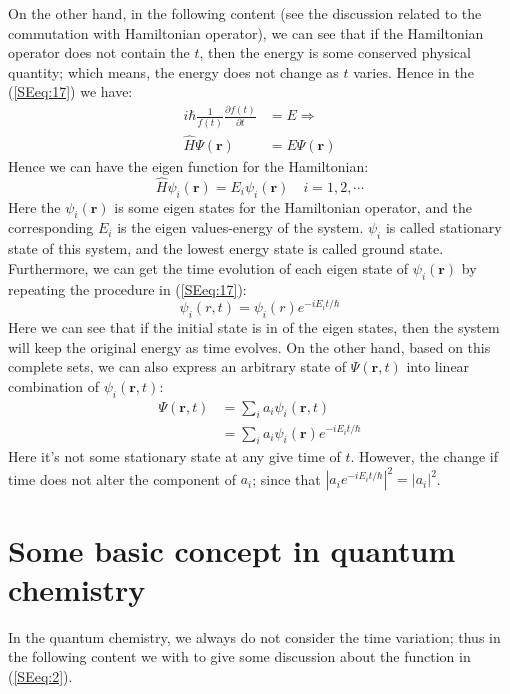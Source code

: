 On the other hand, in the following content (see the discussion
related to the commutation with Hamiltonian operator), we can see
that if the Hamiltonian operator does not contain the $t$, then the
energy is some conserved physical quantity; which means, the energy
does not change as $t$ varies. Hence in the (\ref{SEeq:17}) we have:
\begin{equation}\label{SEeq:19}
\begin{split}
  i \hbar \frac{1}{f(t)}\frac{\partial f(t)}{\partial t}
  &= E  \Rightarrow\\
   \hat{H}\Psi(\bm{r}) &= E\Psi(\bm{r})
\end{split}
\end{equation}
Hence we can have the eigen function for the Hamiltonian:
\begin{equation}\label{SEeq:2}
\hat{H}\psi_{i}(\bm{r}) = E_{i}\psi_{i}(\bm{r}) \quad i=1,2,\cdots
\end{equation}
Here the $\psi_{i}(\bm{r})$ is some eigen states for the Hamiltonian
operator, and the corresponding $E_{i}$ is the eigen values-energy
of the system. $\psi_{i}$ is called stationary state of this system,
and the lowest energy state is called ground state. Furthermore, we
can get the time evolution of each eigen state of $\psi_{i}(\bm{r})$
by repeating the procedure in (\ref{SEeq:17}):
\begin{equation}\label{}
\psi_{i}(r, t) = \psi_{i}(r)e^{-iE_{i}t/\hbar}
\end{equation}
Here we can see that if the initial state is in of the eigen states,
then the system will keep the original energy as time evolves. On
the other hand, based on this complete sets, we can also express an
arbitrary state of $\Psi(\bm{r},t)$ into linear combination of
$\psi_{i}(\bm{r},t)$:
\begin{align}\label{}
\Psi(\bm{r},t) &= \sum_{i}a_{i}\psi_{i}(\bm{r},t) \nonumber \\
&=\sum_{i}a_{i}\psi_{i}(\bm{r})e^{-iE_{i}t/\hbar}
\end{align}
Here it's not some stationary state at any give time of $t$.
However, the change if time does not alter the component of $a_{i}$;
since that $|a_{i}e^{-iE_{i}t/\hbar}|^{2} = |a_{i}|^{2}$.

\section{Some basic concept in quantum chemistry}\label{SE:4}
%
%
%
In the quantum chemistry, we always do not consider the time
variation; thus in the following content we with to give some
discussion about the function in (\ref{SEeq:2}).

